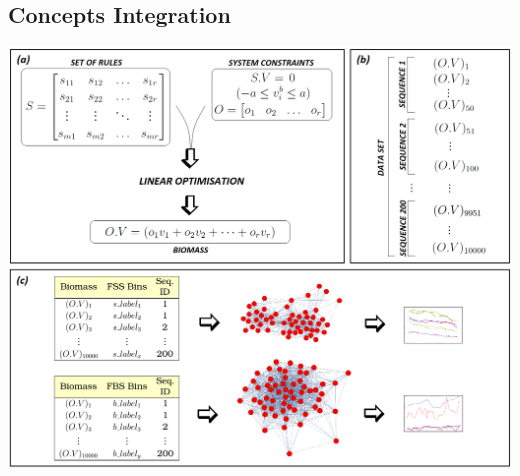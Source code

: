 \subsection[Concepts Integration]{Concepts Integration}
\begin{frame}
	\centering
	\includegraphics[height=\textheight]{../images/methodology-ORmodel-cartoon_complete_framework.png}
\end{frame}